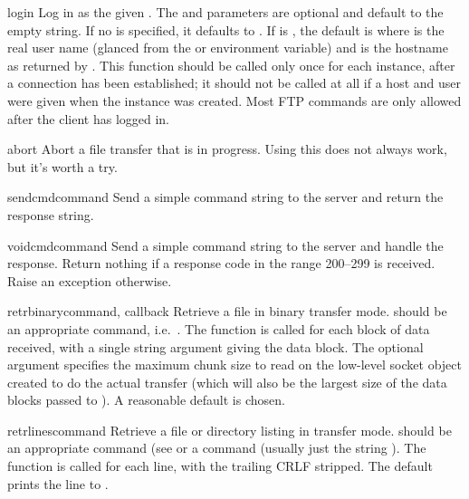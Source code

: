\begin{methoddesc}{login}{}
Log in as the given .  The  and 
parameters are optional and default to the empty string.  If no
 is specified, it defaults to .  If
 is , the default  is
 where  is the real user
name (glanced from the  or  environment
variable) and  is the hostname as returned by
.  This function should be called only
once for each instance, after a connection has been established; it
should not be called at all if a host and user were given when the
instance was created.  Most FTP commands are only allowed after the
client has logged in.
\end{methoddesc}

\begin{methoddesc}{abort}{}
Abort a file transfer that is in progress.  Using this does not always
work, but it's worth a try.
\end{methoddesc}

\begin{methoddesc}{sendcmd}{command}
Send a simple command string to the server and return the response
string.
\end{methoddesc}

\begin{methoddesc}{voidcmd}{command}
Send a simple command string to the server and handle the response.
Return nothing if a response code in the range 200--299 is received.
Raise an exception otherwise.
\end{methoddesc}

\begin{methoddesc}{retrbinary}{command, callback}
Retrieve a file in binary transfer mode.   should be an
appropriate  command, i.e.\ .
The  function is called for each block of data received,
with a single string argument giving the data block.
The optional  argument specifies the maximum chunk size to
read on the low-level socket object created to do the actual transfer
(which will also be the largest size of the data blocks passed to
).  A reasonable default is chosen.
\end{methoddesc}

\begin{methoddesc}{retrlines}{command}
Retrieve a file or directory listing in \ASCII{} transfer mode.
 should be an appropriate  command (see
 or a  command (usually just the string
).  The  function is called for each line,
with the trailing CRLF stripped.  The default  prints
the line to .
\end{methoddesc}

